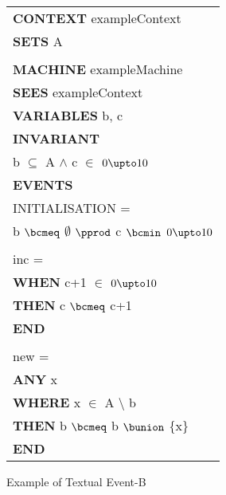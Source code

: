 \begin{figure}
\begin{center}
\begin{tabular}{l}
\textbf{CONTEXT} exampleContext\\
\textbf{SETS} A\\
\\
\textbf{MACHINE} exampleMachine\\
\textbf{SEES} exampleContext\\
\textbf{VARIABLES} b, c\\
\textbf{INVARIANT}\\
\hspace*{0.5cm}b $\subseteq$ A $\land$ c $\in$ $0\upto 10$\\
\textbf{EVENTS}\\
\hspace*{0.5cm}INITIALISATION = \\
\hspace*{1cm}b $\bcmeq$ $\emptyset$ $\pprod$ c $\bcmin$ $0\upto 10$\\
\\
\hspace*{0.5cm}inc =\\
\hspace*{1cm}\textbf{WHEN} c+1 $\in$ $0\upto 10$\\
\hspace*{1cm}\textbf{THEN} c $\bcmeq$ c+1 \\
\hspace*{1cm}\textbf{END}\\
\\
\hspace*{0.5cm}new =\\
\hspace*{1cm}\textbf{ANY} x\\
\hspace*{1cm}\textbf{WHERE} x $\in$ A $\setminus$ b\\
\hspace*{1cm}\textbf{THEN} b $\bcmeq$ b $\bunion$ \{x\}\\
\hspace*{1cm}\textbf{END}
\end{tabular}
\end{center}
	\caption{Example of Textual Event-B}
	\label{fig:TextualEventB}
\end{figure}
\rmfamily
%
